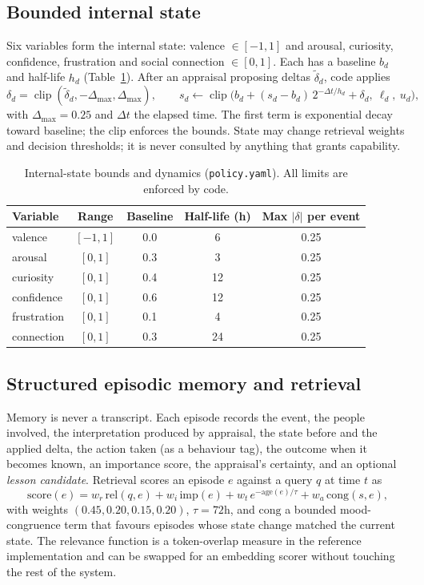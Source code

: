 \documentclass[11pt]{article}
\begin{document}
\subsection{Bounded internal state}\label{sec:affect}
Six variables form the internal state: valence $\in[-1,1]$ and arousal, curiosity, confidence, frustration and social connection $\in[0,1]$. Each has a baseline $b_d$ and half-life $h_d$ (Table~\ref{tab:bounds}). After an appraisal proposing deltas $\tilde\delta_d$, code applies
\begin{equation}
\delta_d=\operatorname{clip}(\tilde\delta_d,-\Delta_{\max},\Delta_{\max}),\qquad
s_d \leftarrow \operatorname{clip}\!\big(b_d+(s_d-b_d)\,2^{-\Delta t/h_d}+\delta_d,\ \ell_d,\ u_d\big),
\end{equation}
with $\Delta_{\max}=0.25$ and $\Delta t$ the elapsed time. The first term is exponential decay toward baseline; the clip enforces the bounds. State may change retrieval weights and decision thresholds; it is never consulted by anything that grants capability.

\begin{table}[h]\centering\small
\caption{Internal-state bounds and dynamics (\texttt{policy.yaml}). All limits are enforced by code.}
\label{tab:bounds}
\begin{tabular}{lcccc}\toprule
Variable & Range & Baseline & Half-life (h) & Max $|\delta|$ per event\\\midrule
valence & $[-1,1]$ & 0.0 & 6 & 0.25\\
arousal & $[0,1]$ & 0.3 & 3 & 0.25\\
curiosity & $[0,1]$ & 0.4 & 12 & 0.25\\
confidence & $[0,1]$ & 0.6 & 12 & 0.25\\
frustration & $[0,1]$ & 0.1 & 4 & 0.25\\
connection & $[0,1]$ & 0.3 & 24 & 0.25\\\bottomrule
\end{tabular}
\end{table}

\subsection{Structured episodic memory and retrieval}
Memory is never a transcript. Each episode records the event, the people involved, the interpretation produced by appraisal, the state before and the applied delta, the action taken (as a behaviour tag), the outcome when it becomes known, an importance score, the appraisal's certainty, and an optional \emph{lesson candidate}. Retrieval scores an episode $e$ against a query $q$ at time $t$ as
\begin{equation}
\mathrm{score}(e)=w_r\,\mathrm{rel}(q,e)+w_i\,\mathrm{imp}(e)+w_t\,e^{-\mathrm{age}(e)/\tau}+w_a\,\mathrm{cong}(s,e),
\end{equation}
with weights $(0.45,0.20,0.15,0.20)$, $\tau=72$h, and $\mathrm{cong}$ a bounded mood-congruence term that favours episodes whose state change matched the current state. The relevance function is a token-overlap measure in the reference implementation and can be swapped for an embedding scorer without touching the rest of the system.
\end{document}
